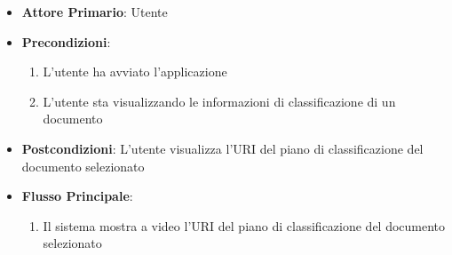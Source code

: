 \begin{itemize}
    \item \textbf{Attore Primario}: Utente
    \item \textbf{Precondizioni}:
    \begin{enumerate}
        \item L'utente ha avviato l'applicazione
        \item L'utente sta visualizzando le informazioni di classificazione di un documento
    \end{enumerate}
    \item \textbf{Postcondizioni}: L'utente visualizza l'URI del piano di classificazione del documento selezionato
    \item \textbf{Flusso Principale}:
        \begin{enumerate}
            \item Il sistema mostra a video l'URI del piano di classificazione del documento selezionato
        \end{enumerate}
\end{itemize}

